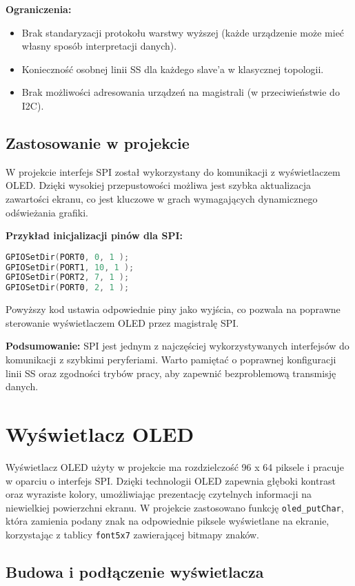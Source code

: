 \documentclass[a4paper,12pt]{report}
\begin{document}
\textbf{Ograniczenia:}
\begin{itemize}
    \item Brak standaryzacji protokołu warstwy wyższej (każde urządzenie może mieć własny sposób interpretacji danych).
    \item Konieczność osobnej linii SS dla każdego slave'a w klasycznej topologii.
    \item Brak możliwości adresowania urządzeń na magistrali (w przeciwieństwie do I2C).
\end{itemize}

\subsection*{Zastosowanie w projekcie}

W projekcie interfejs SPI został wykorzystany do komunikacji z wyświetlaczem OLED. Dzięki wysokiej przepustowości możliwa jest szybka aktualizacja zawartości ekranu, co jest kluczowe w grach wymagających dynamicznego odświeżania grafiki.

\textbf{Przykład inicjalizacji pinów dla SPI:}
\begin{lstlisting}[language=C]
GPIOSetDir(PORT0, 0, 1 );
GPIOSetDir(PORT1, 10, 1 );
GPIOSetDir(PORT2, 7, 1 );
GPIOSetDir(PORT0, 2, 1 );
\end{lstlisting}
Powyższy kod ustawia odpowiednie piny jako wyjścia, co pozwala na poprawne sterowanie wyświetlaczem OLED przez magistralę SPI.

\textbf{Podsumowanie:}  
SPI jest jednym z najczęściej wykorzystywanych interfejsów do komunikacji z szybkimi peryferiami. Warto pamiętać o poprawnej konfiguracji linii SS oraz zgodności trybów pracy, aby zapewnić bezproblemową transmisję danych.

\section{Wyświetlacz OLED}

Wyświetlacz OLED użyty w projekcie ma rozdzielczość 96 x 64 piksele i pracuje w oparciu o interfejs SPI. Dzięki technologii OLED zapewnia głęboki kontrast oraz wyraziste kolory, umożliwiając prezentację czytelnych informacji na niewielkiej powierzchni ekranu. W projekcie zastosowano funkcję \texttt{oled\_putChar}, która zamienia podany znak na odpowiednie piksele wyświetlane na ekranie, korzystając z tablicy \texttt{font5x7} zawierającej bitmapy znaków.

\subsection{Budowa i podłączenie wyświetlacza}
\end{document}

